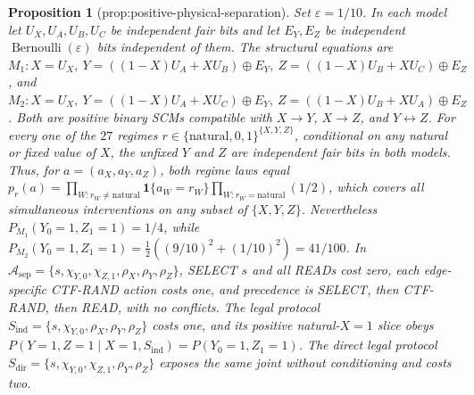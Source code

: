 \documentclass{article}
\newtheorem{proposition}{Proposition}
\begin{document}
\begin{proposition}[prop:positive-physical-separation]\label{prop:positive-physical-separation}
Set \(\varepsilon=1/10\). In each model let \(U_X,U_A,U_B,U_C\) be independent fair bits and let \(E_Y,E_Z\) be independent \(\operatorname{Bernoulli}(\varepsilon)\) bits independent of them. The structural equations are \(M_1:X=U_X,\ Y=((1-X)U_A+XU_B)\oplus E_Y,\ Z=((1-X)U_B+XU_C)\oplus E_Z\), and \(M_2:X=U_X,\ Y=((1-X)U_A+XU_C)\oplus E_Y,\ Z=((1-X)U_B+XU_A)\oplus E_Z\). Both are positive binary SCMs compatible with \(X\to Y\), \(X\to Z\), and \(Y\leftrightarrow Z\). For every one of the \(27\) regimes \(r\in\{\mathrm{natural},0,1\}^{\{X,Y,Z\}}\), conditional on any natural or fixed value of \(X\), the unfixed \(Y\) and \(Z\) are independent fair bits in both models. Thus, for \(a=(a_X,a_Y,a_Z)\), both regime laws equal \(p_r(a)=\prod_{W:r_W\ne\mathrm{natural}}\mathbf1\{a_W=r_W\}\prod_{W:r_W=\mathrm{natural}}(1/2)\), which covers all simultaneous interventions on any subset of \(\{X,Y,Z\}\). Nevertheless \(P_{M_1}(Y_0=1,Z_1=1)=1/4\), while \(P_{M_2}(Y_0=1,Z_1=1)=\tfrac12((9/10)^2+(1/10)^2)=41/100\). In \(\mathcal A_{\mathrm{sep}}=\{s,\chi_{Y,0},\chi_{Z,1},\rho_X,\rho_Y,\rho_Z\}\), SELECT \(s\) and all READs cost zero, each edge-specific CTF-RAND action costs one, and precedence is SELECT, then CTF-RAND, then READ, with no conflicts. The legal protocol \(S_{\mathrm{ind}}=\{s,\chi_{Y,0},\rho_X,\rho_Y,\rho_Z\}\) costs one, and its positive natural-\(X=1\) slice obeys \(P(Y=1,Z=1\mid X=1,S_{\mathrm{ind}})=P(Y_0=1,Z_1=1)\). The direct legal protocol \(S_{\mathrm{dir}}=\{s,\chi_{Y,0},\chi_{Z,1},\rho_Y,\rho_Z\}\) exposes the same joint without conditioning and costs two.
\end{proposition}
\end{document}
